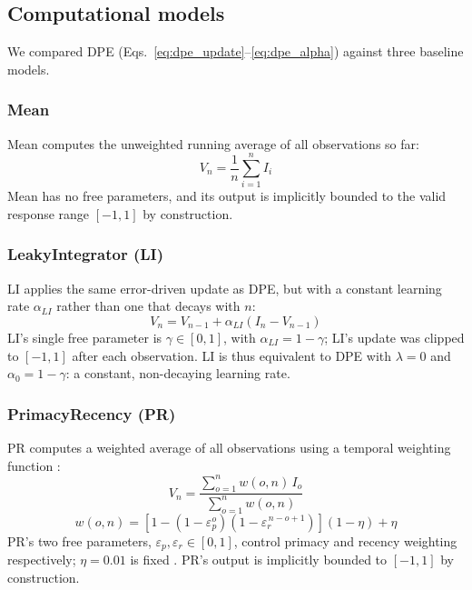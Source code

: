 \documentclass[12pt]{article}
\begin{document}
\subsection{Computational models}
We compared DPE (Eqs.~\ref{eq:dpe_update}--\ref{eq:dpe_alpha}) against three baseline models.

\subsubsection*{Mean}
Mean computes the unweighted running average of all observations so far:
\begin{equation}
    V_n = \frac{1}{n}\sum_{i=1}^n I_i
\end{equation}
Mean has no free parameters, and its output is implicitly bounded to the valid response range $[-1,1]$ by construction.

\subsubsection*{LeakyIntegrator (LI)}
LI applies the same error-driven update as DPE, but with a constant learning rate $\alpha_{LI}$ rather than one that decays with $n$:
\begin{equation}
    V_n = V_{n-1} + \alpha_{LI}\left(I_n - V_{n-1}\right)
\end{equation}
LI's single free parameter is $\gamma \in [0,1]$, with $\alpha_{LI} = 1-\gamma$; LI's update was clipped to $[-1,1]$ after each observation. LI is thus equivalent to DPE with $\lambda=0$ and $\alpha_0 = 1-\gamma$: a constant, non-decaying learning rate.

\subsubsection*{PrimacyRecency (PR)}
PR computes a weighted average of all observations using a temporal weighting function \cite{pooley2011understanding, galdo2022quest}:
\begin{equation}
    V_n = \frac{\sum_{o=1}^n w(o,n)\, I_o}{\sum_{o=1}^n w(o,n)}
\end{equation}
\begin{equation}
    w(o,n) = \left[1 - \left(1-\varepsilon_p^{o}\right)\left(1-\varepsilon_r^{\,n-o+1}\right)\right](1-\eta) + \eta
\end{equation}
PR's two free parameters, $\varepsilon_p, \varepsilon_r \in [0,1]$, control primacy and recency weighting respectively; $\eta=0.01$ is fixed \cite{yoo2025people}. PR's output is implicitly bounded to $[-1,1]$ by construction.
\end{document}
